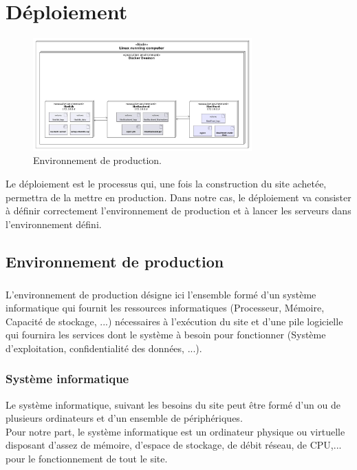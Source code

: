 \chapter{D\'eploiement}


\begin{figure}[ht]
	\includegraphics[width=0.75\textwidth]{Pictures/DiagrammeDeDeploiement.jpg}
	\centering
	\caption{Environnement de production.}
	\label{FigEnvironnementDeProduction}
\end{figure}

Le d\'eploiement est le processus qui, une fois la construction du site achet\'ee, permettra de la mettre en production. Dans notre cas, le d\'eploiement va consister \`a d\'efinir correctement l'environnement de production et \`a lancer les serveurs dans l'environnement d\'efini.


\section{Environnement de production}
\paragraph{} L'environnement de production d\'esigne ici l'ensemble form\'e d'un syst\`eme informatique qui fournit les ressources informatiques (Processeur, M\'emoire, Capacit\'e de stockage, ...) n\'ecessaires \`a l'ex\'ecution du site et d'une pile logicielle qui fournira les services dont le syst\`eme \`a besoin pour fonctionner (Syst\`eme d'exploitation, confidentialit\'e des donn\'ees, ...).

\subsection{Syst\`eme informatique}
Le syst\`eme informatique, suivant les besoins du site peut \^etre form\'e d'un ou de plusieurs ordinateurs et d'un ensemble de p\'eriph\'eriques.\\
Pour notre part, le syst\`eme informatique est un ordinateur physique ou virtuelle disposant d'assez de m\'emoire, d'espace de stockage, de d\'ebit r\'eseau, de CPU,... pour le fonctionnement de tout le site.


